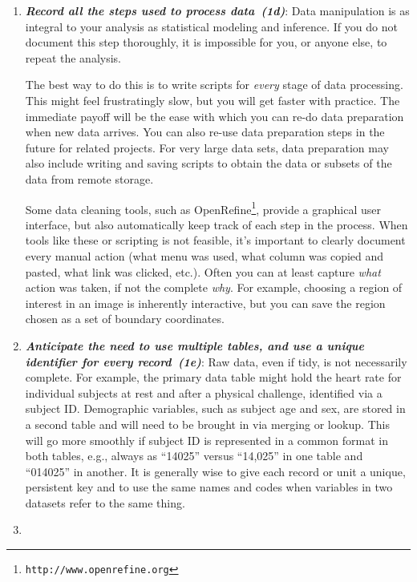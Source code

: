 \documentclass[10pt,letterpaper]{article}
\newcommand{\withurl}[2]{{#1}\footnote{{\texttt{#2}}}}
\newcommand{\practice}[2]{\textbf{\emph{{#2}~({#1})}}}
\begin{document}
\begin{enumerate}
\item

  \practice{1d}{Record all the steps used to process data}: Data
  manipulation is as integral to your analysis as statistical modeling
  and inference. If you do not document this step thoroughly, it is
  impossible for you, or anyone else, to repeat the analysis.

  The best way to do this is to write scripts for \emph{every} stage
  of data processing.  This might feel frustratingly slow, but you
  will get faster with practice. The immediate payoff will be the ease
  with which you can re-do data preparation when new data arrives. You
  can also re-use data preparation steps in the future for related
  projects. For very large data sets, data preparation may also
  include writing and saving scripts to obtain the data or subsets of
  the data from remote storage.

  Some data cleaning tools, such as
  \withurl{OpenRefine}{http://www.openrefine.org}, provide a graphical
  user interface, but also automatically keep track of each step in
  the process. When tools like these or scripting is not feasible,
  it's important to clearly document every manual action (what menu
  was used, what column was copied and pasted, what link was clicked,
  etc.).  Often you can at least capture \emph{what} action was taken,
  if not the complete \emph{why}. For example, choosing a region of
  interest in an image is inherently interactive, but you can save the
  region chosen as a set of boundary coordinates.

\item

  \practice{1e}{Anticipate the need to use multiple tables, and use a
  unique identifier for every record}: Raw data, even if tidy, is
  not necessarily complete. For example, the primary data table might
  hold the heart rate for individual subjects at rest and after a
  physical challenge, identified via a subject ID.  Demographic
  variables, such as subject age and sex, are stored in a second table
  and will need to be brought in via merging or lookup. This will go
  more smoothly if subject ID is represented in a common format in
  both tables, e.g., always as ``14025'' versus ``14,025'' in one
  table and ``014025'' in another. It is generally wise to give each
  record or unit a unique, persistent key and to use the same names
  and codes when variables in two datasets refer to the same thing.

\item


\end{enumerate}
\end{document}
